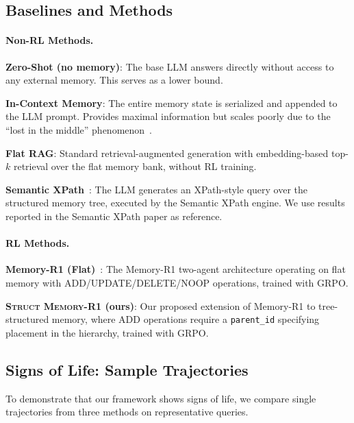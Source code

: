 \documentclass{article}
\theoremstyle{definition}
\begin{document}
\subsection{Baselines and Methods}

\paragraph{Non-RL Methods.}
\textbf{Zero-Shot (no memory)}: The base LLM answers directly without access to any external memory. This serves as a lower bound.

\textbf{In-Context Memory}: The entire memory state is serialized and appended to the LLM prompt. Provides maximal information but scales poorly due to the ``lost in the middle'' phenomenon~\citep{liu2024lost}.

\textbf{Flat RAG}: Standard retrieval-augmented generation with embedding-based top-$k$ retrieval over the flat memory bank, without RL training.

\textbf{Semantic XPath}~\citep{semanticxpath2026}: The LLM generates an XPath-style query over the structured memory tree, executed by the Semantic XPath engine. We use results reported in the Semantic XPath paper as reference.

\paragraph{RL Methods.} \textbf{Memory-R1 (Flat)}~\citep{yan2025memory}: The Memory-R1 two-agent architecture operating on flat memory with ADD/UPDATE/DELETE/NOOP operations, trained with GRPO.

\textbf{\textsc{Struct Memory-R1} (ours)}: Our proposed extension of Memory-R1 to tree-structured memory, where ADD operations require a \texttt{parent\_id} specifying placement in the hierarchy, trained with GRPO.


\subsection{Signs of Life: Sample Trajectories}

To demonstrate that our framework shows signs of life, we compare single trajectories from three methods on representative queries.
\end{document}
